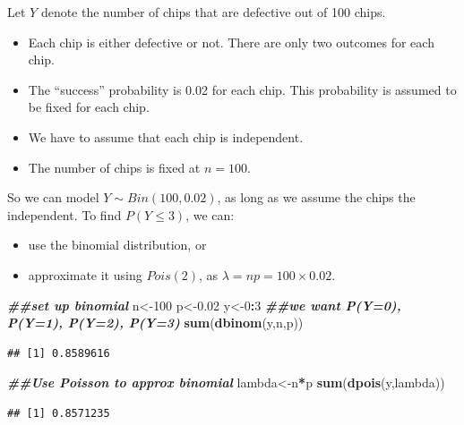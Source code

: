 \documentclass[
]{book}
\newenvironment{Shaded}{\begin{snugshade}}{\end{snugshade}}
\newcommand{\DecValTok}[1]{\textcolor[rgb]{0.00,0.00,0.81}{#1}}
\newcommand{\DocumentationTok}[1]{\textcolor[rgb]{0.56,0.35,0.01}{\textbf{\textit{#1}}}}
\newcommand{\FloatTok}[1]{\textcolor[rgb]{0.00,0.00,0.81}{#1}}
\newcommand{\FunctionTok}[1]{\textcolor[rgb]{0.13,0.29,0.53}{\textbf{#1}}}
\newcommand{\NormalTok}[1]{#1}
\newcommand{\OtherTok}[1]{\textcolor[rgb]{0.56,0.35,0.01}{#1}}
\newcommand{\SpecialCharTok}[1]{\textcolor[rgb]{0.81,0.36,0.00}{\textbf{#1}}}
\providecommand{\tightlist}{%
  \setlength{\itemsep}{0pt}\setlength{\parskip}{0pt}}
\begin{document}
Let \(Y\) denote the number of chips that are defective out of 100 chips.

\begin{itemize}
\tightlist
\item
  Each chip is either defective or not. There are only two outcomes for each chip.
\item
  The ``success'' probability is 0.02 for each chip. This probability is assumed to be fixed for each chip.
\item
  We have to assume that each chip is independent.
\item
  The number of chips is fixed at \(n=100\).
\end{itemize}

So we can model \(Y \sim Bin(100,0.02)\), as long as we assume the chips the independent. To find \(P(Y \leq 3)\), we can:

\begin{itemize}
\tightlist
\item
  use the binomial distribution, or
\item
  approximate it using \(Pois(2)\), as \(\lambda = np = 100 \times 0.02\).
\end{itemize}

\begin{Shaded}
\begin{Highlighting}[]
\DocumentationTok{\#\#set up binomial}
\NormalTok{n}\OtherTok{\textless{}{-}}\DecValTok{100} 
\NormalTok{p}\OtherTok{\textless{}{-}}\FloatTok{0.02} 
\NormalTok{y}\OtherTok{\textless{}{-}}\DecValTok{0}\SpecialCharTok{:}\DecValTok{3} \DocumentationTok{\#\#we want P(Y=0), P(Y=1), P(Y=2), P(Y=3)}
\FunctionTok{sum}\NormalTok{(}\FunctionTok{dbinom}\NormalTok{(y,n,p))}
\end{Highlighting}
\end{Shaded}

\begin{verbatim}
## [1] 0.8589616
\end{verbatim}

\begin{Shaded}
\begin{Highlighting}[]
\DocumentationTok{\#\#Use Poisson to approx binomial}
\NormalTok{lambda}\OtherTok{\textless{}{-}}\NormalTok{n}\SpecialCharTok{*}\NormalTok{p}
\FunctionTok{sum}\NormalTok{(}\FunctionTok{dpois}\NormalTok{(y,lambda))}
\end{Highlighting}
\end{Shaded}

\begin{verbatim}
## [1] 0.8571235
\end{verbatim}
\end{document}
